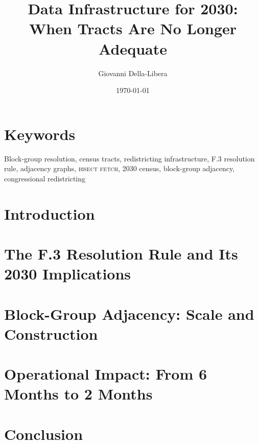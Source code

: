 \documentclass[12pt]{article}
\title{\textbf{Data Infrastructure for 2030:\\
When Tracts Are No Longer Adequate}}
\author{Giovanni Della-Libera}
\date{\today}
\begin{document}
\maketitle

\begin{abstract}

\end{abstract}

\section*{Keywords}
Block-group resolution, census tracts, redistricting infrastructure, F.3 resolution rule,
adjacency graphs, \textsc{bisect fetch}, 2030 census, block-group adjacency,
congressional redistricting

\section{Introduction}


\section{The F.3 Resolution Rule and Its 2030 Implications}


\section{Block-Group Adjacency: Scale and Construction}


\section{Operational Impact: From 6 Months to 2 Months}


\section{Conclusion}




\end{document}
